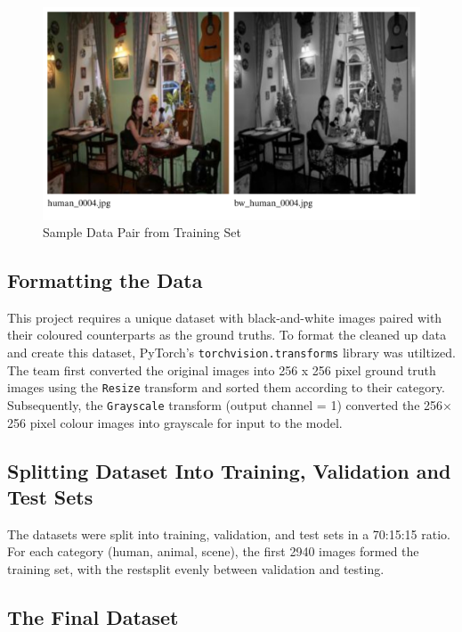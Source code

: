 \documentclass{article} %
\begin{document}
\begin{figure}[htbp]            %
  \centering
  \includegraphics[width=1\linewidth]{Figs/Data Example.png}
  \caption{Sample Data Pair from Training Set}
  \label{fig:data_example}
\end{figure}

\subsection{Formatting the Data}

This project requires a unique dataset with black-and-white images paired with their coloured counterparts as the ground truths. To format the cleaned up data and create this dataset, 
PyTorch's \verb|torchvision.transforms| library was utiltized. The team first converted the original images into 256 x 256 pixel ground truth images using the \verb|Resize| transform 
and sorted them according to their category. Subsequently, the \verb|Grayscale| transform (output channel = 1) converted the 256$\times$256 pixel colour images into grayscale for input 
to the model.

\subsection{Splitting Dataset Into Training, Validation and Test Sets}

The datasets were split into training, validation, and test sets in a 70:15:15 ratio. For each category (human, animal, scene), the first 2940 images formed the training set, with the 
restsplit evenly between validation and testing.

\subsection{The Final Dataset}
\end{document}
